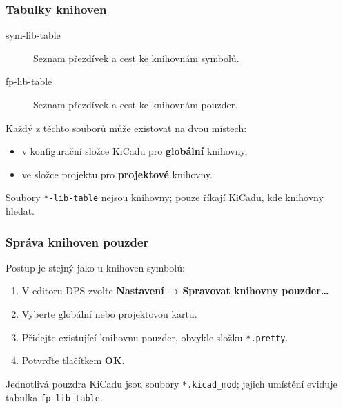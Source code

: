 \documentclass{beamer}
\begin{document}
\begin{frame}
	\frametitle{Tabulky knihoven}
	\begin{description}
		\item[sym-lib-table] Seznam přezdívek a cest ke knihovnám symbolů.
		\item[fp-lib-table] Seznam přezdívek a cest ke knihovnám pouzder.
	\end{description}

	\medskip
	Každý z těchto souborů může existovat na dvou místech:
	\begin{itemize}
		\item v konfigurační složce KiCadu pro \textbf{globální} knihovny,
		\item ve složce projektu pro \textbf{projektové} knihovny.
	\end{itemize}

	\vfill
	Soubory \texttt{*-lib-table} nejsou knihovny; pouze říkají KiCadu, kde knihovny hledat.

\end{frame}

\begin{frame}
	\frametitle{Správa knihoven pouzder}
	Postup je stejný jako u knihoven symbolů:
	\begin{enumerate}
		\item V editoru DPS zvolte \textbf{Nastavení → Spravovat knihovny pouzder\ldots}
		\item Vyberte globální nebo projektovou kartu.
		\item Přidejte existující knihovnu pouzder, obvykle složku \texttt{*.pretty}.
		\item Potvrďte tlačítkem \textbf{OK}.
	\end{enumerate}

	\vfill
	Jednotlivá pouzdra KiCadu jsou soubory \texttt{*.kicad\_mod}; jejich umístění eviduje tabulka \texttt{fp-lib-table}.

\end{frame}

\end{document}
